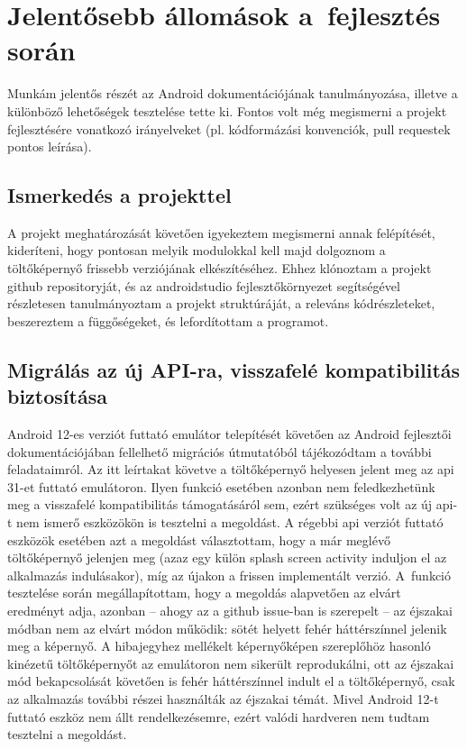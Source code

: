 \chapter{Jelentősebb állomások a~fejlesztés során}
Munkám jelentős részét az Android dokumentációjának tanulmányozása, illetve a különböző lehetőségek
tesztelése tette ki. Fontos volt még megismerni a projekt fejlesztésére vonatkozó irányelveket
(pl. kódformázási konvenciók, pull requestek pontos leírása).

\section{Ismerkedés a projekttel}
A projekt meghatározását követően igyekeztem megismerni annak felépítését, kideríteni, hogy
pontosan melyik modulokkal kell majd dolgoznom a töltőképernyő frissebb verziójának elkészítéséhez.
Ehhez klónoztam a projekt \gls{github} repositoryját, és az \gls{androidstudio} fejlesztőkörnyezet
segítségével részletesen tanulmányoztam a projekt struktúráját, a releváns kódrészleteket,
beszereztem a függőségeket, és lefordítottam a programot.

\section{Migrálás az új API-ra, visszafelé kompatibilitás biztosítása}
Android 12-es verziót futtató emulátor telepítését követően az Android fejlesztői
dokumentációjában fellelhető migrációs útmutatóból tájékozódtam a további feladataimról.
Az itt leírtakat követve a töltőképernyő helyesen jelent meg az \acrshort{api} 31-et futtató emulátoron.
Ilyen funkció esetében azonban nem feledkezhetünk meg a visszafelé kompatibilitás támogatásáról
sem, ezért szükséges volt az új \acrshort{api}-t nem ismerő eszközökön is tesztelni a megoldást.
A régebbi \acrshort{api} verziót futtató eszközök esetében azt a megoldást választottam, hogy a már meglévő
töltőképernyő jelenjen meg (azaz egy külön splash screen activity induljon el az alkalmazás
indulásakor), míg az újakon a frissen implementált verzió. A~funkció tesztelése során
megállapítottam, hogy a megoldás alapvetően az elvárt eredményt adja, azonban -- ahogy az a
\gls{github} issue-ban is szerepelt -- az éjszakai módban nem az elvárt módon működik: sötét helyett
fehér háttérszínnel jelenik meg a képernyő. A hibajegyhez mellékelt képernyőképen szereplőhöz
hasonló kinézetű töltőképernyőt az emulátoron nem sikerült reprodukálni, ott az éjszakai mód
bekapcsolását követően is fehér háttérszínnel indult el a töltőképernyő, csak az alkalmazás
további részei használták az éjszakai témát. Mivel Android 12-t futtató eszköz nem állt
rendelkezésemre, ezért valódi hardveren nem tudtam tesztelni a megoldást.

